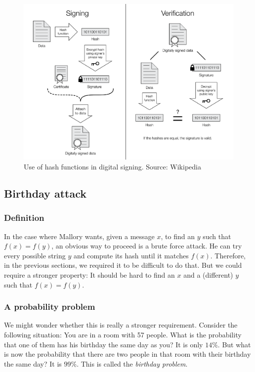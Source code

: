\documentclass[12pt,a4paper]{article}
\begin{document}
\begin{figure}[h]
\includegraphics[width=16cm]{Digital_Signature_diagram.pdf}
\caption{Use of hash functions in digital signing. Source: Wikipedia}\label{fig:dsd}
\end{figure}

\subsection{Birthday attack}

\subsubsection{Definition}

In the case where Mallory wants, given a message $x$, to find an $y$ such that $f(x)=f(y)$, an obvious way to proceed is a brute force attack. He can try every possible string $y$ and compute its hash until it matches $f(x)$. Therefore, in the previous sections, we required it to be difficult to do that. But we could require a stronger property: It should be hard to find an $x$ and a (different) $y$ such that $f(x)=f(y)$.

\subsubsection{A probability problem}

We might wonder whether this is really a stronger requirement. Consider the following situation: You are in a room with 57 people. What is the probability that one of them has his birthday the same day as you? It is only $14\%$. But what is now the probability that there are two people in that room with their birthday the same day? It is $99\%$. This is called the {\em birthday problem}.
\end{document}
